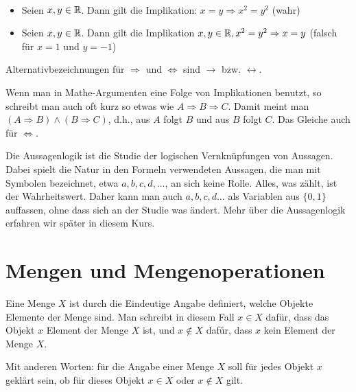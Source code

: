 \begin{bsp}\
	\begin{itemize}
		\item Seien $ x,y \in \mathbb{R}$. Dann gilt die Implikation: $x = y \Rightarrow x^2 = y^2 $ (wahr)
		\item Seien $x,y \in \mathbb{R}$. Dann gilt die Implikation $ x,y \in \mathbb{R}, x^2 = y^2 \Rightarrow x = y $ (falsch für $x=1$ und $y=-1$)	
	\end{itemize}
\end{bsp}

\begin{bem}
	Alternativbezeichnungen für $\Rightarrow$ und $\Leftrightarrow$ sind $\rightarrow$ bzw. $\leftrightarrow$. 
\end{bem} 

\begin{bem}
	Wenn man in Mathe-Argumenten eine Folge von Implikationen benutzt, so schreibt man auch oft kurz so etwas wie $A \Rightarrow B \Rightarrow C$. Damit meint man  $(A \Rightarrow B) \wedge (B \Rightarrow C)$, d.h., aus $A$ folgt $B$ und aus $B$ folgt $C$. Das Gleiche auch für $\Leftrightarrow$. 
\end{bem} 


\begin{bem}
	Die Aussagenlogik ist die Studie der logischen Vernknüpfungen von Aussagen. Dabei spielt die Natur in den Formeln verwendeten Aussagen, die man mit Symbolen bezeichnet, etwa $a,b, c, d, \ldots$, an sich keine Rolle. Alles, was zählt, ist der Wahrheitswert. Daher kann man auch $a,b,c,d \ldots$ als Variablen aus $\{0,1\}$ auffassen, ohne dass sich an der Studie was ändert. Mehr über die Aussagenlogik erfahren wir später in diesem Kurs. 
\end{bem} 

\clearpage
\section{Mengen und Mengenoperationen}


\begin{defn} 
	Eine Menge $X$ ist durch die Eindeutige Angabe definiert, welche Objekte Elemente der Menge sind. Man schreibt in diesem Fall $x \in X$ dafür, dass das Objekt $x$ Element der Menge $X$ ist, und $x \not\in X$ dafür, dass $x$ kein Element der Menge $X$. 
	
	Mit anderen Worten: für die Angabe einer Menge $X$ soll für jedes Objekt $x$ geklärt sein, ob für dieses Objekt $x \in X$ oder $x\not \in X$ gilt. 
\end{defn} 

